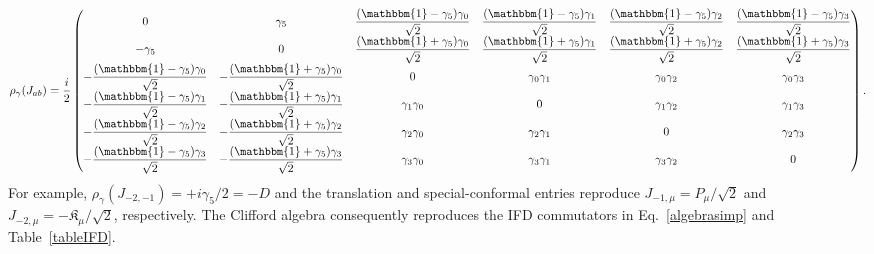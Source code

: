 \documentclass[foundations,article,submit,pdftex,moreauthors]{Definitions/mdpi}
\begin{document}
\begin{align}
\rho_\gamma(J_{ab})=\frac{i}{2}
\begin{pmatrix}
0&{\gamma_5}&\dfrac{(\mathbbm{1}-\gamma_5)\gamma_0}{\sqrt{2}}&\dfrac{(\mathbbm{1}-\gamma_5)\gamma_1}{\sqrt{2}}&\dfrac{(\mathbbm{1}-\gamma_5)\gamma_2}{\sqrt{2}}&\dfrac{(\mathbbm{1}-\gamma_5)\gamma_3}{\sqrt{2}}\\
{-\gamma_5}&0&\dfrac{(\mathbbm{1}+\gamma_5)\gamma_0}{\sqrt{2}}&\dfrac{(\mathbbm{1}+\gamma_5)\gamma_1}{\sqrt{2}}&\dfrac{(\mathbbm{1}+\gamma_5)\gamma_2}{\sqrt{2}}&\dfrac{(\mathbbm{1}+\gamma_5)\gamma_3}{\sqrt{2}}\\
-\dfrac{(\mathbbm{1}-\gamma_5)\gamma_0}{\sqrt{2}}&-\dfrac{(\mathbbm{1}+\gamma_5)\gamma_0}{\sqrt{2}}&0&\gamma_0\gamma_1&\gamma_0\gamma_2&\gamma_0\gamma_3\\
-\dfrac{(\mathbbm{1}-\gamma_5)\gamma_1}{\sqrt{2}}&-\dfrac{(\mathbbm{1}+\gamma_5)\gamma_1}{\sqrt{2}}&\gamma_1\gamma_0&0&\gamma_1\gamma_2&\gamma_1\gamma_3\\
-\dfrac{(\mathbbm{1}-\gamma_5)\gamma_2}{\sqrt{2}}&-\dfrac{(\mathbbm{1}+\gamma_5)\gamma_2}{\sqrt{2}}&\gamma_2\gamma_0&\gamma_2\gamma_1&0&\gamma_2\gamma_3\\
-\dfrac{(\mathbbm{1}-\gamma_5)\gamma_3}{\sqrt{2}}&-\dfrac{(\mathbbm{1}+\gamma_5)\gamma_3}{\sqrt{2}}&\gamma_3\gamma_0&\gamma_3\gamma_1&\gamma_3\gamma_2&0
\end{pmatrix}.
\label{eq:ifd-dirac-jab}
\end{align}
\endgroup
For example, $\rho_\gamma(J_{-2,-1})={+}i\gamma_5/2=-D$ and the
translation and special-conformal entries reproduce
$J_{-1,\mu}=P_\mu/\sqrt{2}$ and
$J_{-2,\mu}=-\mathfrak{K}_\mu/\sqrt{2}$, respectively. The Clifford
algebra consequently reproduces the IFD commutators in
Eq.~\eqref{algebrasimp} and Table~\ref{tableIFD}.
\end{document}

